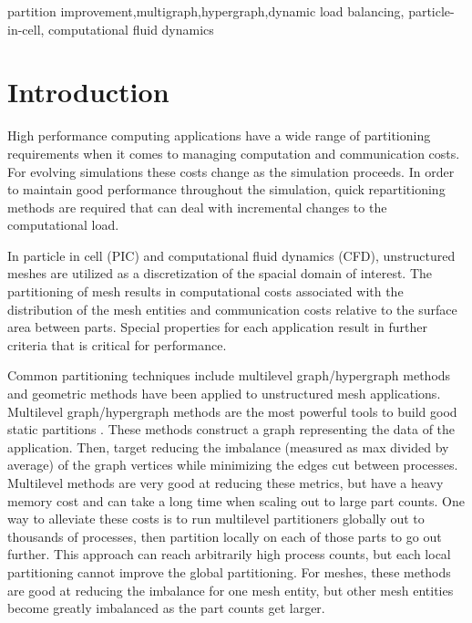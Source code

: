 \documentclass[conference]{IEEEtran}
\begin{document}
\begin{IEEEkeywords}
partition improvement,multigraph,hypergraph,dynamic load balancing,
particle-in-cell, computational fluid dynamics
\end{IEEEkeywords}

\section{Introduction}

High performance computing applications have a wide range of partitioning requirements when
it comes to managing computation and communication costs. For evolving simulations these
costs change as the simulation proceeds. In order to maintain good performance throughout the
simulation, quick repartitioning methods are required that can deal with incremental changes
to the computational load.

In particle in cell (PIC) and computational fluid dynamics (CFD), unstructured meshes are utilized
as a discretization of the spacial domain of interest. The partitioning of mesh results in
computational costs associated with the distribution of the mesh entities and communication
costs relative to the surface area between parts. Special properties for each application
result in further criteria that is critical for performance.

Common partitioning techniques include multilevel graph/hypergraph methods
and geometric methods have been applied to unstructured mesh applications. Multilevel
graph/hypergraph methods are the most powerful tools to build good static partitions
\cite{catalyurek2013umpa,karypis1999parallel,lasalle2013multi,schloegel2002parallel}.
These methods construct a graph representing the data of the application. Then, target
reducing the imbalance (measured as max divided by average) of the graph vertices while
minimizing the edges cut between processes. Multilevel methods are very good at reducing
these metrics, but have a heavy memory cost and can take a long time when scaling out to large
part counts. One way to alleviate these costs is to run multilevel partitioners globally
out to thousands of processes, then partition locally on each of those parts to go out
further. This approach can reach arbitrarily high process counts, but each
local partitioning cannot improve the global partitioning. For meshes, these methods
are good at reducing the imbalance for one mesh entity,
but other mesh entities become greatly imbalanced as the part counts get larger.
\end{document}
